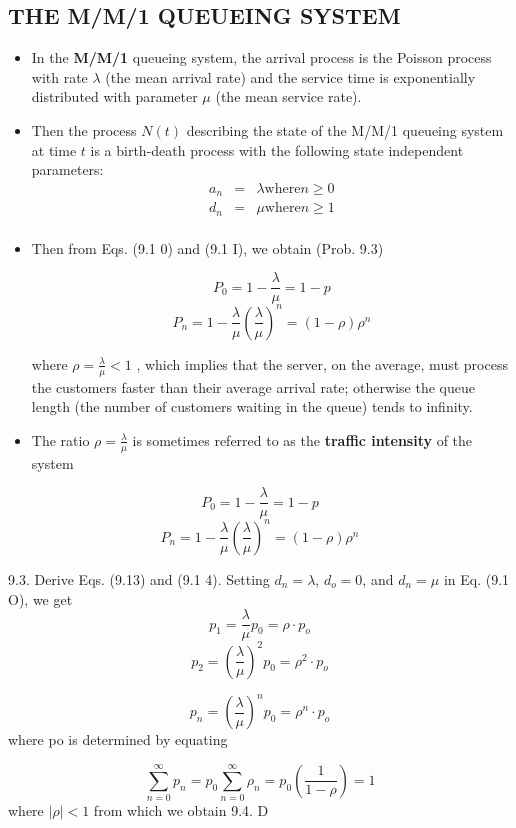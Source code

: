 \documentclass[a4paper12pt]{article}
\begin{document}
\large 
\subsection*{THE M/M/1 QUEUEING SYSTEM }

\begin{itemize}
    \item In the \textbf{M/M/1} queueing system, the arrival process is the Poisson process with rate $\lambda$ (the mean 
arrival rate) and the service time is exponentially distributed with parameter $\mu$ (the mean service rate). 
\item Then the process $N(t)$ describing the state of the M/M/1 queueing system at time $t$ is a birth-death 
process with the following state independent parameters:
\begin{eqnarray*}
a_n &=& \lambda \mbox{where} n\geq 0\\
d_n &=& \mu   \mbox{where} n\geq 1\\
\end{eqnarray*}
\item Then from Eqs. (9.1 0) and (9.1 I), we obtain (Prob. 9.3) 

\[ P_{0} = 1 - \frac{\lambda}{\mu} = 1-p\]
\[ P_{n} = 1 - \frac{\lambda}{\mu}\left(\frac{\lambda}{\mu}\right)^{n} = (1-\rho)\rho^{n} \]


where ${\rho = \frac{\lambda}{\mu} < 1}$ , which implies that the server, on the average, must process the customers faster 
than their average arrival rate; otherwise the queue length (the number of customers waiting in the 
queue) tends to infinity. 
\item The ratio ${\rho = \frac{\lambda}{\mu} }$ is sometimes referred to as the \textbf{traffic intensity} of the system
\end{itemize}

\newpage 
\[ P_{0} = 1 - \frac{\lambda}{\mu} = 1-p\]
\[ P_{n} = 1 - \frac{\lambda}{\mu}\left(\frac{\lambda}{\mu}\right)^{n} = (1-\rho)\rho^{n} \]

9.3. Derive Eqs. (9.13) and (9.1 4). 
Setting $d_n = \lambda$, $d_o = 0$, and $d_n = \mu$ in Eq. (9.1 O), we get 
\[p_{1}= \frac{\lambda}{\mu} p_{0} = \rho\cdot p_{o} \]
\[p_{2}= \left(\frac{\lambda}{\mu} \right)^{2}p_{0} = \rho^{2}\cdot p_{o} \]

\[p_{n}= \left(\frac{\lambda}{\mu} \right)^{n}p_{0} = \rho^{n}\cdot p_{o} \]
where po is determined by equating 

\[\sum^{\infty}_{n=0}p_{n} = p_{0}\sum^{\infty}_{n=0}\rho_{n} = p_{0}\left(\frac{1}{1-\rho} \right) = 1 \] where $\mid\rho\mid < 1 $
from which we obtain 
9.4. D
\end{document}
